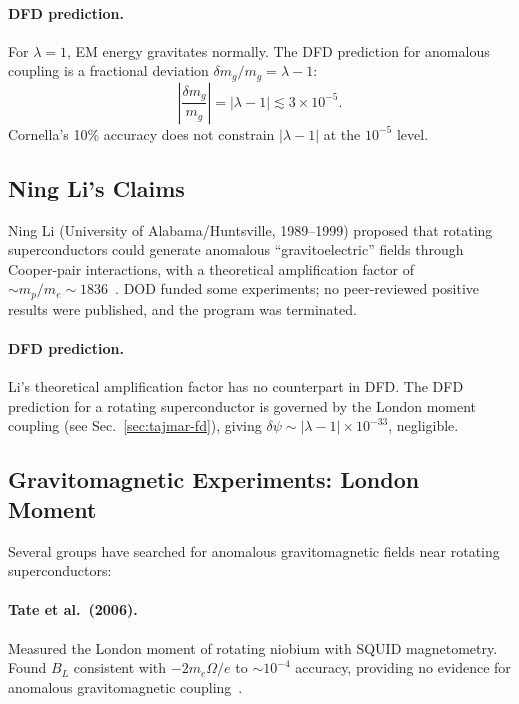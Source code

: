 \documentclass[aps,prd,twocolumn,superscriptaddress,floatfix,nofootinbib]{revtex4-2}
\newcommand{\lam}{\lambda}
\begin{document}
\paragraph{DFD prediction.}
For $\lambda = 1$, EM energy gravitates normally. The DFD prediction
for anomalous coupling is a fractional deviation
$\delta m_g/m_g = \lambda - 1$:
\begin{equation}
\left|\frac{\delta m_g}{m_g}\right| = |\lam - 1| \lesssim 3\times10^{-5}.
\end{equation}
Cornella's 10\% accuracy does not constrain $|\lam-1|$ at the
$10^{-5}$ level.

\subsection{Ning Li's Claims}\label{sec:ning-li}

Ning Li (University of Alabama/Huntsville, 1989--1999) proposed
that rotating superconductors could generate anomalous
``gravitoelectric'' fields through Cooper-pair interactions, with
a theoretical amplification factor of
$\sim m_p/m_e \sim 1836$~\cite{Li1991,Li1993}. DOD funded some
experiments; no peer-reviewed positive results were published, and
the program was terminated.

\paragraph{DFD prediction.}
Li's theoretical amplification factor has no counterpart in DFD. The
DFD prediction for a rotating superconductor is governed by the London
moment coupling (see Sec.~\ref{sec:tajmar-fd}), giving
$\delta\psi \sim |\lam-1| \times 10^{-33}$, negligible.

\subsection{Gravitomagnetic Experiments: London Moment}\label{sec:london}

Several groups have searched for anomalous gravitomagnetic fields
near rotating superconductors:

\paragraph{Tate et al.\ (2006).}
Measured the London moment of rotating niobium with SQUID
magnetometry. Found $B_L$ consistent with $-2m_e\Omega/e$ to
$\sim 10^{-4}$ accuracy, providing no evidence for anomalous
gravitomagnetic coupling~\cite{Tate2006}.
\end{document}
